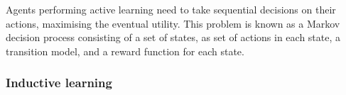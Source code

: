 Agents performing active learning need to take sequential decisions on their
actions, maximising the eventual utility. This problem is known as a Markov
decision process consisting of a set of states, as set of actions in each
state, a transition model, and a reward function for each state.



\subsubsection{Inductive learning}

\subsubsection{}


